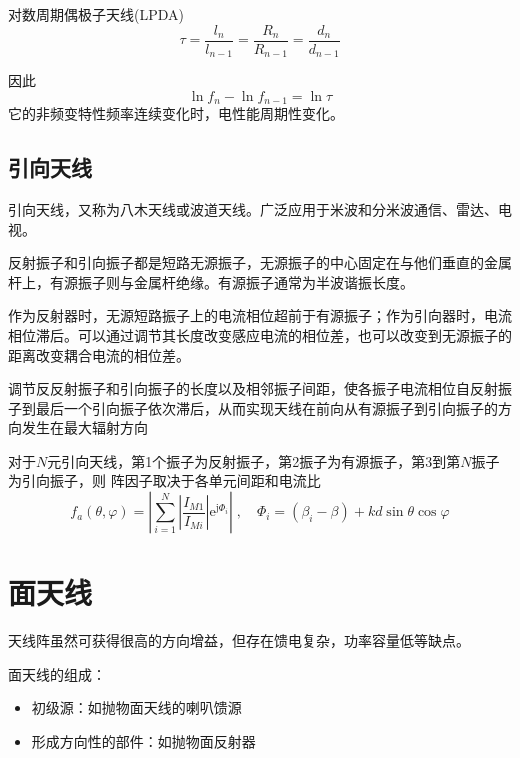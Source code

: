     对数周期偶极子天线(LPDA)
    \begin{equation}
        \tau=\frac{l_n}{l_{n-1}}=\frac{R_n}{R_{n-1}}=\frac{d_n}{d_{n-1}}
    \end{equation}

    因此
    \begin{equation}
        \ln f_n -\ln f_{n-1} =\ln \tau
    \end{equation}
    它的非频变特性频率连续变化时，电性能周期性变化。


    
    \subsection{引向天线}

    引向天线，又称为八木天线或波道天线。广泛应用于米波和分米波通信、雷达、电视。

    反射振子和引向振子都是短路无源振子，无源振子的中心固定在与他们垂直的金属杆上，有源振子则与金属杆绝缘。有源振子通常为半波谐振长度。

    作为反射器时，无源短路振子上的电流相位超前于有源振子；作为引向器时，电流相位滞后。可以通过调节其长度改变感应电流的相位差，也可以改变到无源振子的距离改变耦合电流的相位差。

    调节反反射振子和引向振子的长度以及相邻振子间距，使各振子电流相位自反射振子到最后一个引向振子依次滞后，从而实现天线在前向从有源振子到引向振子的方向发生在最大辐射方向

    对于$N$元引向天线，第1个振子为反射振子，第2振子为有源振子，第3到第$N$振子为引向振子，则
    阵因子取决于各单元间距和电流比
    \begin{equation}
        f_a(\theta,\varphi)=\left\vert \sum_{i=1}^{N}\left\vert \frac{I_{M1}}{I_{Mi}}\right\vert \mathrm{e}^{\mathrm{j}\varPhi_i}\right\vert\;,\quad \varPhi_i=(\beta_i-\beta)+kd\sin\theta\cos \varphi
    \end{equation}



\section{面天线}

    天线阵虽然可获得很高的方向增益，但存在馈电复杂，功率容量低等缺点。

    面天线的组成：
    \begin{itemize}
        \item 初级源：如抛物面天线的喇叭馈源
        \item 形成方向性的部件：如抛物面反射器
    \end{itemize}

